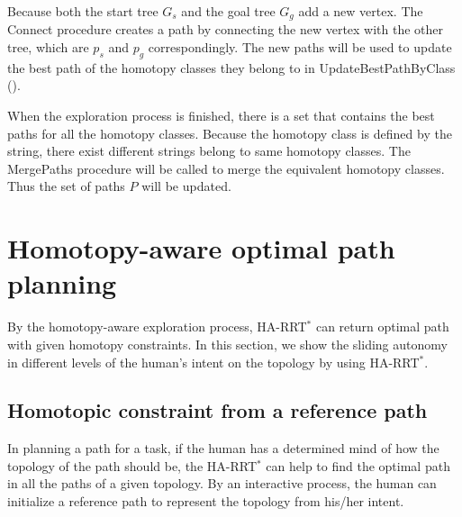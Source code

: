\documentclass[letterpaper, 10 pt, conference]{ieeeconf}
\begin{document}
Because both the start tree $ G_{s} $ and the goal tree $ G_{g} $ add a new vertex. 
The {\sc Connect} procedure creates a path by connecting the new vertex with the other tree, which are $ p_{s} $ and $ p_{g} $ correspondingly.
The new paths will be used to update the best path of the homotopy classes they belong to in {\sc UpdateBestPathByClass} ().

When the exploration process is finished, there is a set that contains the best paths for all the homotopy classes.
Because the homotopy class is defined by the string,
there exist different strings belong to same homotopy classes.
The {\sc MergePaths} procedure will be called to merge the equivalent homotopy classes. 
Thus the set of paths $ P $ will be updated.

\section{Homotopy-aware optimal path planning}
\label{sec:application}

By the homotopy-aware exploration process, HA-RRT$^{*}$ can return optimal path with given homotopy constraints.
In this section, we show the sliding autonomy in different levels of the human's intent on the topology by using HA-RRT$^{*}$.

\subsection{Homotopic constraint from a reference path}

In planning a path for a task, if the human has a determined mind of how the topology of the path should be, the HA-RRT$^{*}$ can help to find the optimal path in all the paths of a given topology.
By an interactive process, the human can initialize a reference path to represent the topology from his/her intent.
\end{document}
